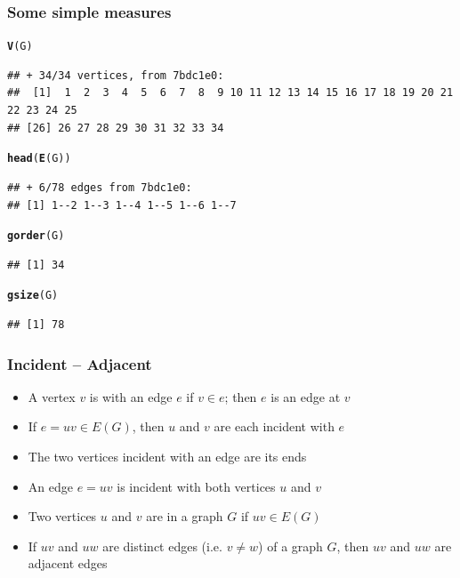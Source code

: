 \documentclass[aspectratio=169]{beamer}\usepackage[]{graphicx}\usepackage[]{xcolor}
\makeatletter
\newcommand{\hldef}[1]{\textcolor[rgb]{0.345,0.345,0.345}{#1}}%
\newcommand{\hlkwd}[1]{\textcolor[rgb]{0.737,0.353,0.396}{\textbf{#1}}}%
\newenvironment{kframe}{%
 \def\at@end@of@kframe{}%
 \ifinner\ifhmode%
  \def\at@end@of@kframe{\end{minipage}}%
  \begin{minipage}{\columnwidth}%
 \fi\fi%
 \def\FrameCommand##1{\hskip\@totalleftmargin \hskip-\fboxsep
 \colorbox{shadecolor}{##1}\hskip-\fboxsep
     \hskip-\linewidth \hskip-\@totalleftmargin \hskip\columnwidth}%
 \MakeFramed {\advance\hsize-\width
   \@totalleftmargin\z@ \linewidth\hsize
   \@setminipage}}%
 {\par\unskip\endMakeFramed%
 \at@end@of@kframe}
\newenvironment{knitrout}{}{} %
\makeatother
\begin{document}
\begin{frame}[fragile]\frametitle{Some simple measures}
\begin{knitrout}
\color{fgcolor}\begin{kframe}
\begin{alltt}
\hlkwd{V}\hldef{(G)}
\end{alltt}
\begin{verbatim}
## + 34/34 vertices, from 7bdc1e0:
##  [1]  1  2  3  4  5  6  7  8  9 10 11 12 13 14 15 16 17 18 19 20 21 22 23 24 25
## [26] 26 27 28 29 30 31 32 33 34
\end{verbatim}
\begin{alltt}
\hlkwd{head}\hldef{(}\hlkwd{E}\hldef{(G))}
\end{alltt}
\begin{verbatim}
## + 6/78 edges from 7bdc1e0:
## [1] 1--2 1--3 1--4 1--5 1--6 1--7
\end{verbatim}
\begin{alltt}
\hlkwd{gorder}\hldef{(G)}
\end{alltt}
\begin{verbatim}
## [1] 34
\end{verbatim}
\begin{alltt}
\hlkwd{gsize}\hldef{(G)}
\end{alltt}
\begin{verbatim}
## [1] 78
\end{verbatim}
\end{kframe}
\end{knitrout}
\end{frame}

\begin{frame}\frametitle{Incident -- Adjacent}
	\begin{definition}[Incident]
	\begin{itemize}
	\item A vertex $v$ is  with an edge $e$ if $v\in e$; then $e$ is an edge at $v$
	\item If $e=uv\in E(G)$, then $u$ and $v$ are each incident with $e$
	\item The two vertices incident with an edge are its ends
	\item An edge $e=uv$ is incident with both vertices $u$ and $v$
	\end{itemize}
	\end{definition}
	\vfill
	\begin{definition}[Adjacent]
	\begin{itemize}
	\item Two vertices $u$ and $v$ are  in a graph $G$ if $uv\in E(G)$
	\item If $uv$ and $uw$ are distinct edges (i.e. $v\not=w$) of a graph $G$, then $uv$ and $uw$ are adjacent edges
	\end{itemize}
	\end{definition}
\end{frame}
\end{document}
